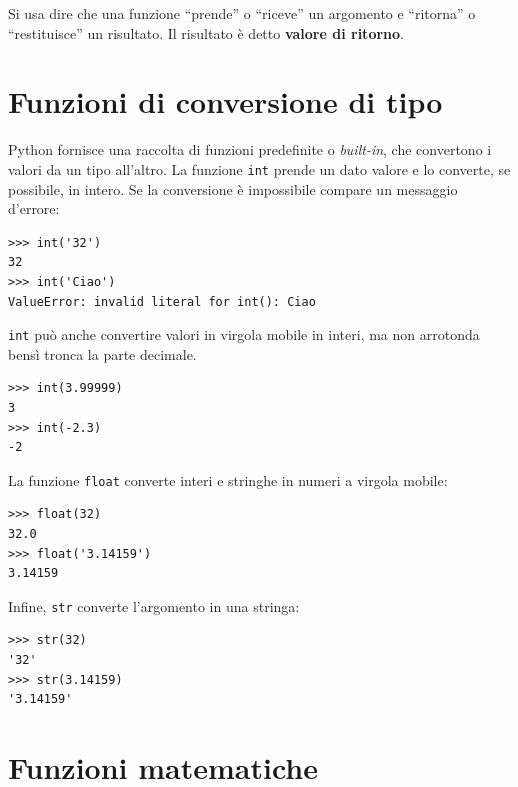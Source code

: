 \documentclass[10pt]{book}
\begin{document}
Si usa dire che una funzione ``prende'' o ``riceve'' un argomento e ``ritorna'' o ``restituisce'' un risultato.  Il risultato è detto {\bf valore di ritorno}.


\section{Funzioni di conversione di tipo}



Python fornisce una raccolta di funzioni predefinite o {\em built-in}, che convertono i valori da un tipo all'altro. La funzione {\tt int} prende un dato valore e lo converte, se possibile, in intero. Se la conversione è impossibile compare un messaggio d'errore:

\begin{verbatim}
>>> int('32')
32
>>> int('Ciao')
ValueError: invalid literal for int(): Ciao
\end{verbatim}
%
{\tt int} può anche convertire valori in virgola mobile in interi, ma non arrotonda bensì tronca la parte decimale.

\begin{verbatim}
>>> int(3.99999)
3
>>> int(-2.3)
-2
\end{verbatim}
%
La funzione {\tt float} converte interi e stringhe in numeri a virgola mobile:

\begin{verbatim}
>>> float(32)
32.0
>>> float('3.14159')
3.14159
\end{verbatim}
%
Infine, {\tt str} converte l'argomento in una stringa:

\begin{verbatim}
>>> str(32)
'32'
>>> str(3.14159)
'3.14159'
\end{verbatim}
%



\section{Funzioni matematiche}
\end{document}
